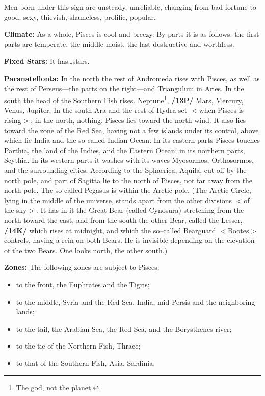 Men born under this sign are unsteady, unreliable, changing from bad fortune to good, sexy, thievish, shameless, prolific, popular.

\textbf{Climate:} As a whole, Pisces is cool and breezy. By parts it is as follows: the first parts are temperate, the
middle moist, the last destructive and worthless. 

\textbf{Fixed Stars:} It has…stars. 

\textbf{Paranatellonta:} In the north the rest of Andromeda rises with Pisces, as well as the rest of Perseus—the parts on the right—and Triangulum in Aries. In the south the head of the Southern Fish rises. Neptune\footnote{The god, not the planet.}, \textbf{/13P/} Mars, Mercury, Venus, Jupiter. In the south Ara and the rest of Hydra set $<$when Pisces is rising$>$; in the north, nothing. Pisces lies toward the north wind. It also lies toward the zone of the Red Sea, having not a few
islands under its control, above which lie India and the so-called Indian Ocean. In its eastern parts Pisces touches Parthia, the land of the Indies, and the Eastern Ocean; in its northern parts, Scythia. In its western parts it washes with its waves Myosormos, Orthosormos, and the surrounding cities.
According to the Sphaerica, Aquila, cut off by the north pole, and part of Sagitta lie to the north of Pisces, not far away from the north pole. The so-called Pegasus is within the Arctic pole. (The Arctic Circle, lying in the middle of the universe, stands apart from the other divisions $<$of the sky$>$. It has in it the Great Bear (called Cynosura) stretching from the north toward the east, and from the south the other Bear, called the Lesser, \textbf{/14K/} which rises at midnight, and which the so–called Bearguard $<$Bootes$>$ controls, having a rein on both Bears. He is invisible depending on the elevation of the two Bears. One looks north, the other south.) 

\textbf{Zones:} The following zones are subject to Pisces: 
\begin{itemize}
\item to the front, the Euphrates and the Tigris; 
\item to the middle, Syria and the Red Sea, India, mid-Persis and the neighboring lands; 
\item to the tail, the Arabian Sea, the Red Sea, and the Borysthenes river; 
\item to the tie of the Northern Fish, Thrace; 
\item to that of the Southern Fish, Asia, Sardinia.
\end{itemize}

\newpage